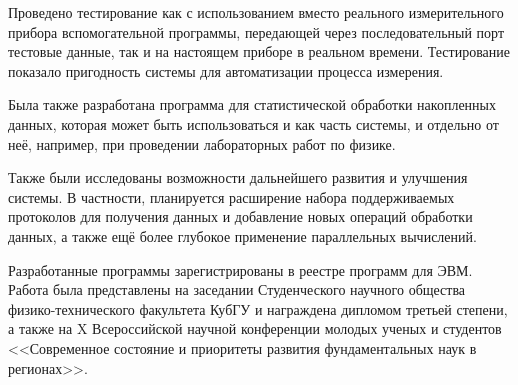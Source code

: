 \documentclass[a4paper, 14pt, titlepage]{extarticle}
\newcounter{firstpage}
\newcommand\lastPageHere{\setcounter{pagenum}{\value{page} - \value{firstpage}}}
\newcommand{\checkdate}[3]{(дата обращения: \formatdate{#1}{#2}{#3})}
\begin{document}
  Проведено тестирование как с использованием вместо реального измерительного прибора вспомогательной
  программы, передающей через последовательный порт тестовые данные, так и на настоящем приборе в
  реальном времени. Тестирование показало пригодность системы для автоматизации процесса измерения.

  Была также разработана программа для статистической обработки накопленных
  данных, которая может быть использоваться и как часть системы, и отдельно от неё, например, при
  проведении лабораторных работ по физике.

  Также были исследованы возможности дальнейшего развития и улучшения системы. В частности,
  планируется расширение набора поддерживаемых протоколов для получения данных и добавление новых
  операций обработки данных, а также ещё более глубокое применение параллельных вычислений.

  Разработанные программы зарегистрированы в реестре программ для ЭВМ. Работа была представлены на
  заседании Студенческого научного общества физико-технического факультета КубГУ и награждена
  дипломом третьей степени, а также на X Всероссийской научной конференции молодых ученых и
  студентов <<Современное состояние и приоритеты развития фундаментальных наук в регионах>>.

  \lastPageHere

  \begin{flushleft}
    
  \end{flushleft}
\end{document}
